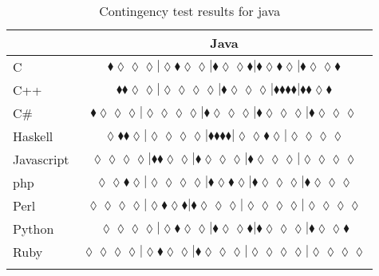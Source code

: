 \begin{table*}
\centering
\begin{tabular}{l c}
& Java \\
\hline

C & $\scriptscriptstyle\blacklozenge\lozenge\lozenge\lozenge|\lozenge\blacklozenge\lozenge\lozenge|\blacklozenge\lozenge\lozenge\blacklozenge|\blacklozenge\lozenge\blacklozenge\lozenge|\blacklozenge\lozenge\lozenge\blacklozenge$ \\
C++ & $\scriptscriptstyle\blacklozenge\blacklozenge\lozenge\lozenge|\lozenge\lozenge\lozenge\lozenge|\blacklozenge\lozenge\lozenge\lozenge|\blacklozenge\blacklozenge\blacklozenge\blacklozenge|\blacklozenge\blacklozenge\lozenge\blacklozenge$ \\
C\# & $\scriptscriptstyle\blacklozenge\lozenge\lozenge\lozenge|\lozenge\lozenge\lozenge\lozenge|\blacklozenge\lozenge\lozenge\lozenge|\blacklozenge\lozenge\lozenge\lozenge|\blacklozenge\lozenge\lozenge\lozenge$ \\
Haskell & $\scriptscriptstyle\lozenge\blacklozenge\blacklozenge\lozenge|\lozenge\lozenge\lozenge\lozenge|\blacklozenge\blacklozenge\blacklozenge\blacklozenge|\lozenge\lozenge\blacklozenge\lozenge|\lozenge\lozenge\lozenge\lozenge$ \\
Javascript & $\scriptscriptstyle\lozenge\lozenge\lozenge\lozenge|\blacklozenge\blacklozenge\lozenge\lozenge|\blacklozenge\lozenge\lozenge\lozenge|\blacklozenge\lozenge\lozenge\lozenge|\lozenge\lozenge\lozenge\lozenge$ \\
{\sc php} & $\scriptscriptstyle\lozenge\lozenge\blacklozenge\lozenge|\lozenge\lozenge\lozenge\lozenge|\blacklozenge\lozenge\blacklozenge\lozenge|\blacklozenge\lozenge\lozenge\lozenge|\blacklozenge\lozenge\lozenge\lozenge$ \\
Perl & $\scriptscriptstyle\lozenge\lozenge\lozenge\lozenge|\lozenge\blacklozenge\lozenge\blacklozenge|\blacklozenge\lozenge\lozenge\lozenge|\lozenge\lozenge\lozenge\lozenge|\lozenge\lozenge\lozenge\lozenge$ \\
Python & $\scriptscriptstyle\lozenge\lozenge\lozenge\lozenge|\lozenge\blacklozenge\lozenge\lozenge|\blacklozenge\lozenge\lozenge\blacklozenge|\blacklozenge\lozenge\lozenge\lozenge|\blacklozenge\lozenge\lozenge\blacklozenge$ \\
Ruby & $\scriptscriptstyle\lozenge\lozenge\lozenge\lozenge|\lozenge\blacklozenge\lozenge\lozenge|\blacklozenge\lozenge\lozenge\lozenge|\lozenge\lozenge\lozenge\lozenge|\lozenge\lozenge\lozenge\lozenge$ \\

\hline
& \\
\end{tabular}
\caption{Contingency test results for java}
\label{tbl:contingency-test-results-java}
\end{table*}


